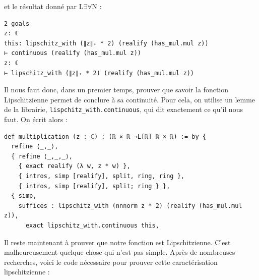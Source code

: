 \documentclass[a4paper, 11pt, twoside]{report}
\newcommand{\LEAN}{L$\exists\forall$N }
\begin{document}
    et le résultat donné par \LEAN :
   
\begin{lstlisting}
2 goals
z: ℂ
this: lipschitz_with (∥z∥₊ * 2) (realify (has_mul.mul z))
⊢ continuous (realify (has_mul.mul z))
z: ℂ
⊢ lipschitz_with (∥z∥₊ * 2) (realify (has_mul.mul z))
\end{lstlisting}

Il nous faut donc, dans un premier temps, prouver que savoir la fonction Lipschitzienne permet de conclure à sa continuité. Pour cela, on utilise un lemme de la librairie, \verb|lispchitz_with.continuous|, qui dit exactement ce qu'il nous faut. On écrit alors :

\begin{lstlisting}
def multiplication (z : ℂ) : (ℝ × ℝ →L[ℝ] ℝ × ℝ) := by {
  refine ⟨_,_⟩,
  { refine ⟨_,_,_⟩,
    { exact realify (λ w, z * w) },
    { intros, simp [realify], split, ring, ring },
    { intros, simp [realify], split; ring } },
  { simp, 
    suffices : lipschitz_with (nnnorm z * 2) (realify (has_mul.mul z)),
      exact lipschitz_with.continuous this, 
\end{lstlisting}

Il reste maintenant à prouver que notre fonction est Lipschitzienne. C'est malheureusement quelque chose qui n'est pas simple. Après de nombreuses recherches, voici le code nécessaire pour prouver cette caractérisation lipschitzienne :
\end{document}
